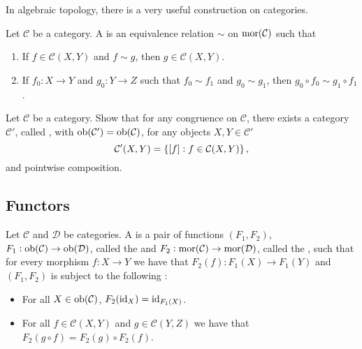 In algebraic topology, there is a very useful construction on categories.

\begin{definition}[Congruence]
	Let $\mathcal{C}$ be a category. A  is an equivalence relation $\sim$ on $\operatorname{mor}(\mathcal{C})$ such that 
	\begin{enumerate}[label = \textup{(}\alph*\textup{)},wide = 0pt]
		\item If $f \in \mathcal{C}(X,Y)$ and $f {\sim} g$, then $g \in \mathcal{C}(X,Y)$.
		\item If $f_0 : X \to Y$ and $g_0 : Y \to Z$ such that $f_0 {\sim} f_1$ and $g_0 {\sim} g_1$, then $g_0 \circ f_0 {\sim} g_1 \circ f_1$.
	\end{enumerate}
\end{definition}

\begin{exercise}
	Let $\mathcal{C}$ be a category. Show that for any congruence on $\mathcal{C}$, there exists a category $\mathcal{C}'$, called , with $\operatorname{ob}(\mathcal{C}') = \operatorname{ob}(\mathcal{C})$, for any objects $X,Y \in \mathcal{C}'$
	\begin{equation*}
		\mathcal{C}'(X,Y) = \cbr[0]{\sbr[0]{f} : f \in \mathcal{C}(X,Y)},
	\end{equation*}
	\noindent and pointwise composition.
\end{exercise}

\subsection*{Functors}

\begin{definition}[Functor]
	Let $\mathcal{C}$ and $\mathcal{D}$ be categories. A  is a pair of functions $(F_1,F_2)$, $F_1 : \operatorname{ob}(\mathcal{C}) \to \operatorname{ob}(\mathcal{D})$, called the  and $F_2 : \operatorname{mor}(\mathcal{C}) \to \operatorname{mor}(\mathcal{D})$, called the , such that for every morphism $f : X \to Y$ we have that $F_2(f) : F_1(X) \to F_1(Y)$ and $(F_1,F_2)$ is subject to the following :
	\begin{itemize}[leftmargin = *]
		\item For all $X \in \operatorname{ob}(\mathcal{C})$, $F_2(\operatorname{id}_X) = \operatorname{id}_{F_1(X)}$.
		\item For all $f \in \mathcal{C}(X,Y)$ and $g \in \mathcal{C}(Y,Z)$ we have that $F_2(g \circ f) = F_2(g) \circ F_2(f)$.
	\end{itemize}
\end{definition}

